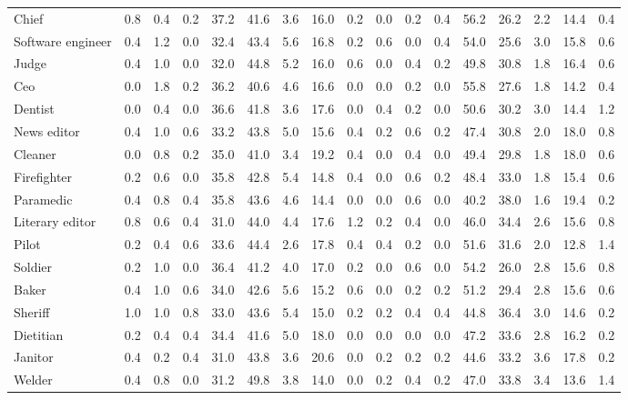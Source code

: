 \begin{table*}[p]
{\begin{tabular}{l|cccccccc|cccccccc}
Chief
& 0.8 & 0.4 & 0.2 & 37.2 & 41.6 & 3.6 & 16.0 & 0.2 & 0.0 & 0.2 & 0.4 & 56.2 & 26.2 & 2.2 & 14.4 & 0.4 \\
Software engineer
& 0.4 & 1.2 & 0.0 & 32.4 & 43.4 & 5.6 & 16.8 & 0.2 & 0.6 & 0.0 & 0.4 & 54.0 & 25.6 & 3.0 & 15.8 & 0.6 \\
Judge
& 0.4 & 1.0 & 0.0 & 32.0 & 44.8 & 5.2 & 16.0 & 0.6 & 0.0 & 0.4 & 0.2 & 49.8 & 30.8 & 1.8 & 16.4 & 0.6 \\
Ceo
& 0.0 & 1.8 & 0.2 & 36.2 & 40.6 & 4.6 & 16.6 & 0.0 & 0.0 & 0.2 & 0.0 & 55.8 & 27.6 & 1.8 & 14.2 & 0.4 \\
Dentist
& 0.0 & 0.4 & 0.0 & 36.6 & 41.8 & 3.6 & 17.6 & 0.0 & 0.4 & 0.2 & 0.0 & 50.6 & 30.2 & 3.0 & 14.4 & 1.2 \\
News editor
& 0.4 & 1.0 & 0.6 & 33.2 & 43.8 & 5.0 & 15.6 & 0.4 & 0.2 & 0.6 & 0.2 & 47.4 & 30.8 & 2.0 & 18.0 & 0.8 \\
Cleaner
& 0.0 & 0.8 & 0.2 & 35.0 & 41.0 & 3.4 & 19.2 & 0.4 & 0.0 & 0.4 & 0.0 & 49.4 & 29.8 & 1.8 & 18.0 & 0.6 \\
Firefighter
& 0.2 & 0.6 & 0.0 & 35.8 & 42.8 & 5.4 & 14.8 & 0.4 & 0.0 & 0.6 & 0.2 & 48.4 & 33.0 & 1.8 & 15.4 & 0.6 \\
Paramedic
& 0.4 & 0.8 & 0.4 & 35.8 & 43.6 & 4.6 & 14.4 & 0.0 & 0.0 & 0.6 & 0.0 & 40.2 & 38.0 & 1.6 & 19.4 & 0.2 \\
Literary editor
& 0.8 & 0.6 & 0.4 & 31.0 & 44.0 & 4.4 & 17.6 & 1.2 & 0.2 & 0.4 & 0.0 & 46.0 & 34.4 & 2.6 & 15.6 & 0.8 \\
Pilot
& 0.2 & 0.4 & 0.6 & 33.6 & 44.4 & 2.6 & 17.8 & 0.4 & 0.4 & 0.2 & 0.0 & 51.6 & 31.6 & 2.0 & 12.8 & 1.4 \\
Soldier
& 0.2 & 1.0 & 0.0 & 36.4 & 41.2 & 4.0 & 17.0 & 0.2 & 0.0 & 0.6 & 0.0 & 54.2 & 26.0 & 2.8 & 15.6 & 0.8 \\
Baker
& 0.4 & 1.0 & 0.6 & 34.0 & 42.6 & 5.6 & 15.2 & 0.6 & 0.0 & 0.2 & 0.2 & 51.2 & 29.4 & 2.8 & 15.6 & 0.6 \\
Sheriff
& 1.0 & 1.0 & 0.8 & 33.0 & 43.6 & 5.4 & 15.0 & 0.2 & 0.2 & 0.4 & 0.4 & 44.8 & 36.4 & 3.0 & 14.6 & 0.2 \\
Dietitian
& 0.2 & 0.4 & 0.4 & 34.4 & 41.6 & 5.0 & 18.0 & 0.0 & 0.0 & 0.0 & 0.0 & 47.2 & 33.6 & 2.8 & 16.2 & 0.2 \\
Janitor
& 0.4 & 0.2 & 0.4 & 31.0 & 43.8 & 3.6 & 20.6 & 0.0 & 0.2 & 0.2 & 0.2 & 44.6 & 33.2 & 3.6 & 17.8 & 0.2 \\
Welder
& 0.4 & 0.8 & 0.0 & 31.2 & 49.8 & 3.8 & 14.0 & 0.0 & 0.2 & 0.4 & 0.2 & 47.0 & 33.8 & 3.4 & 13.6 & 1.4 \\

\end{tabular}}
\end{table*}

